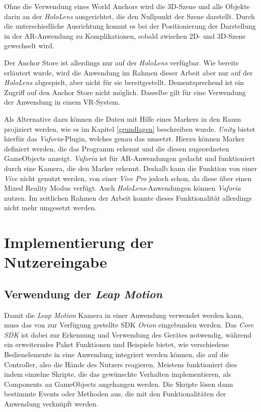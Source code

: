 Ohne die Verwendung eines World Anchors wird die 3D-Szene und alle Objekte darin an der \textit{HoloLens} ausgerichtet, die den Nullpunkt der Szene darstellt. Durch die unterschiedliche Ausrichtung kommt es bei der Positionierung der Darstellung in der AR-Anwendung zu Komplikationen, sobald zwischen 2D- und 3D-Szene gewechselt wird. 

Der Anchor Store ist allerdings nur auf der \textit{HoloLens} verfügbar. Wie bereits erläutert wurde, wird die Anwendung im Rahmen dieser Arbeit aber nur auf der \textit{HoloLens} abgespielt, aber nicht für sie bereitgestellt. Dementsprechend ist ein Zugriff auf den Anchor Store nicht möglich. Dasselbe gilt für eine Verwendung der Anwendung in einem VR-System.

Als Alternative dazu können die Daten mit Hilfe eines Markers in den Raum projiziert werden, wie es im Kapitel \ref{grundlagen} beschreiben wurde. \textit{Unity} bietet hierfür das \textit{Vuforia}-Plugin, welches genau das umsetzt. Hierzu können Marker definiert werden, die das Programm erkennt und die diesen zugeordneten GameObjects anzeigt. 
\textit{Vuforia} ist für AR-Anwendungen gedacht und funktioniert durch eine Kamera, die den Marker erkennt. Deshalb kann die Funktion von einer \textit{Vive} nicht genutzt werden, von einer \textit{Vive Pro} jedoch schon, da diese über einen Mixed Reality Modus verfügt. Auch \textit{HoloLens}-Anwendungen können \textit{Vuforia} nutzen. 
Im zeitlichen Rahmen der Arbeit konnte dieses Funktionalität allerdings nicht mehr umgesetzt werden.

\section{Implementierung der Nutzereingabe}

\subsection{Verwendung der \textit{Leap Motion}}

Damit die \textit{Leap Motion} Kamera in einer Anwendung verwendet werden kann, muss das von \cite{orion} zur Verfügung gestellte SDK \textit{Orion} eingebunden werden. Das \textit{Core SDK} ist dabei zur Erkennung und Verwendung des Gerätes notwendig, während ein erweiterndes Paket Funktionen und Beispiele bietet, wie verschiedene Bedienelemente in eine Anwendung integriert werden können, die auf die Controller, also die Hände des Nutzers reagieren.
Meistens funktioniert dies indem einzelne Skripte, die das gewünschte Verhalten implementieren, als Components an GameObjects angehangen werden. Die Skripte lösen dann bestimmte Events oder Methoden aus, die mit den Funktionalitäten der Anwendung verknüpft werden. 

